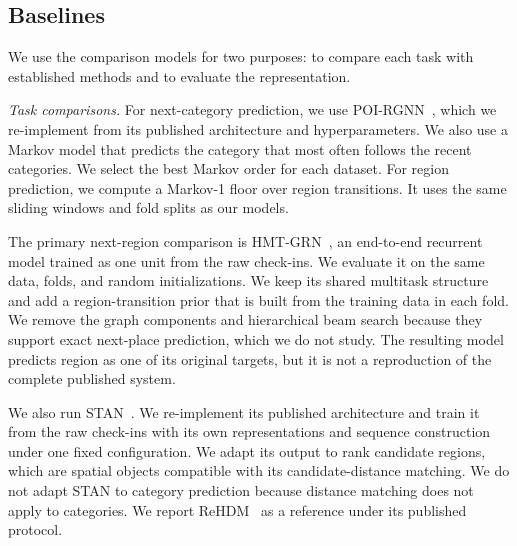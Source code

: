
\subsection{Baselines}
\label{sec:mobiwac:setup-baselines}
We use the comparison models for two purposes: to compare each task with established methods and to evaluate the representation.

\emph{Task comparisons.} For next-category prediction, we use POI-RGNN~\cite{capanema2023poirgnn}, which we re-implement from its published architecture and hyperparameters. We also use a Markov model that predicts the category that most often follows the recent categories. We select the best Markov order for each dataset. For region prediction, we compute a Markov-1 floor over region transitions. It uses the same sliding windows and fold splits as our models.

The primary next-region comparison is HMT-GRN~\cite{Lim2022}, an end-to-end recurrent model trained as one unit from the raw check-ins. We evaluate it on the same data, folds, and random initializations. We keep its shared multitask structure and add a region-transition prior that is built from the training data in each fold. We remove the graph components and hierarchical beam search because they support exact next-place prediction, which we do not study. The resulting model predicts region as one of its original targets, but it is not a reproduction of the complete published system.

We also run STAN~\cite{luo2021stan}. We re-implement its published architecture and train it from the raw check-ins with its own representations and sequence construction under one fixed configuration. We adapt its output to rank candidate regions, which are spatial objects compatible with its candidate-distance matching. We do not adapt STAN to category prediction because distance matching does not apply to categories. We report ReHDM~\cite{li2025rehdm} as a reference under its published protocol.

